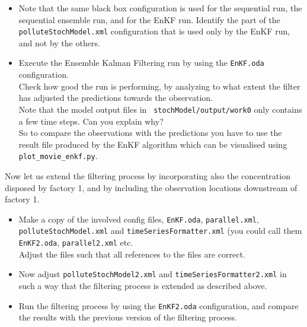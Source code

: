 \begin{itemize}
 \item Note that the same black box configuration is used for the sequential
   run, the sequential ensemble run, and for the EnKF run. Identify the part of
   the {\tt polluteStochModel.xml} configuration that is used only by the EnKF
   run, and not by the others.
 \item Execute the Ensemble Kalman Filtering run by using the {\tt EnKF.oda}
   configuration.\\ Check how good the run is performing, by analyzing to what
   extent the filter has adjusted the predictions towards the
   observation.\\ Note that the model output files in {\tt
     stochModel/output/work0} only contains a few time steps. Can you explain
   why?\\ So to compare the observations with the predictions you have to use
   the result file produced by the EnKF algorithm which can be visualised using
   {\tt plot\_movie\_enkf.py}.
\end{itemize}

Now let us extend the filtering process by incorporating also the concentration
disposed by factory 1, and by including the observation locations downstream of
factory 1.

\begin{itemize}
	\item Make a copy of the involved config files, {\tt EnKF.oda}, 
		{\tt parallel.xml}, {\tt polluteStochModel.xml} and
		{\tt timeSeriesFormatter.xml} (you could call them
		{\tt EnKF2.oda}, {\tt parallel2.xml} etc.
		\\ Adjust the files such that all references to the files are correct.
	\item Now adjust {\tt polluteStochModel2.xml} and {\tt timeSeriesFormatter2.xml}
	      in such a way that the filtering process is extended as described above.
 \item Run the filtering process by using the {\tt EnKF2.oda} configuration,
   and compare the results with the previous version of the filtering process.
\end{itemize}

